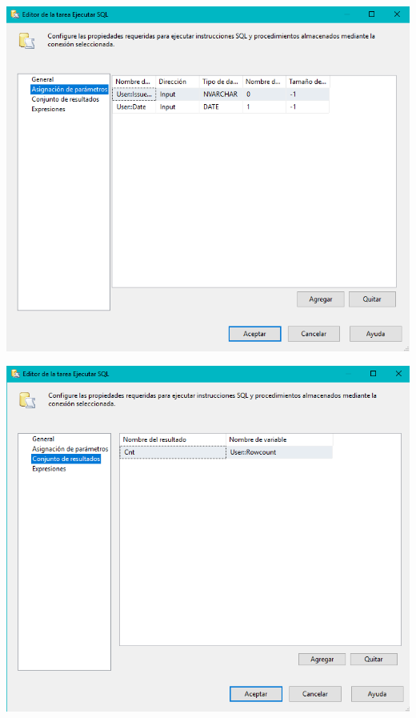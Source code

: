 	\begin{center}
	\includegraphics[width=\columnwidth]{images/task2/img24}
    \end{center}	
    
	\begin{center}
	\includegraphics[width=\columnwidth]{images/task2/img25}
    \end{center}	
    

